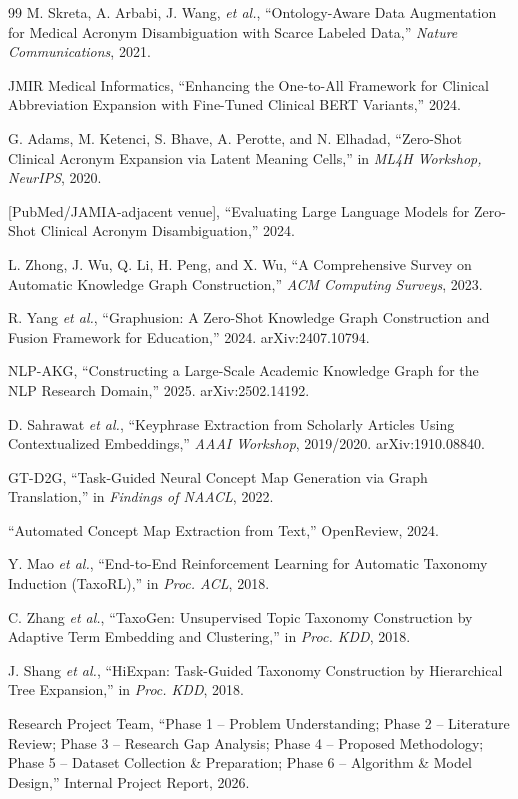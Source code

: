 \documentclass[10pt,conference]{IEEEtran}
\begin{document}
\begin{thebibliography}{99}
 M. Skreta, A. Arbabi, J. Wang, \emph{et al.}, ``Ontology-Aware Data Augmentation for Medical Acronym Disambiguation with Scarce Labeled Data,'' \emph{Nature Communications}, 2021.

 JMIR Medical Informatics, ``Enhancing the One-to-All Framework for Clinical Abbreviation Expansion with Fine-Tuned Clinical BERT Variants,'' 2024.

 G. Adams, M. Ketenci, S. Bhave, A. Perotte, and N. Elhadad, ``Zero-Shot Clinical Acronym Expansion via Latent Meaning Cells,'' in \emph{ML4H Workshop, NeurIPS}, 2020.

 [PubMed/JAMIA-adjacent venue], ``Evaluating Large Language Models for Zero-Shot Clinical Acronym Disambiguation,'' 2024.

 L. Zhong, J. Wu, Q. Li, H. Peng, and X. Wu, ``A Comprehensive Survey on Automatic Knowledge Graph Construction,'' \emph{ACM Computing Surveys}, 2023.

 R. Yang \emph{et al.}, ``Graphusion: A Zero-Shot Knowledge Graph Construction and Fusion Framework for Education,'' 2024. arXiv:2407.10794.

 NLP-AKG, ``Constructing a Large-Scale Academic Knowledge Graph for the NLP Research Domain,'' 2025. arXiv:2502.14192.

 D. Sahrawat \emph{et al.}, ``Keyphrase Extraction from Scholarly Articles Using Contextualized Embeddings,'' \emph{AAAI Workshop}, 2019/2020. arXiv:1910.08840.

 GT-D2G, ``Task-Guided Neural Concept Map Generation via Graph Translation,'' in \emph{Findings of NAACL}, 2022.

 ``Automated Concept Map Extraction from Text,'' OpenReview, 2024.

 Y. Mao \emph{et al.}, ``End-to-End Reinforcement Learning for Automatic Taxonomy Induction (TaxoRL),'' in \emph{Proc. ACL}, 2018.

 C. Zhang \emph{et al.}, ``TaxoGen: Unsupervised Topic Taxonomy Construction by Adaptive Term Embedding and Clustering,'' in \emph{Proc. KDD}, 2018.

 J. Shang \emph{et al.}, ``HiExpan: Task-Guided Taxonomy Construction by Hierarchical Tree Expansion,'' in \emph{Proc. KDD}, 2018.

 Research Project Team, ``Phase 1 -- Problem Understanding; Phase 2 -- Literature Review; Phase 3 -- Research Gap Analysis; Phase 4 -- Proposed Methodology; Phase 5 -- Dataset Collection \& Preparation; Phase 6 -- Algorithm \& Model Design,'' Internal Project Report, 2026.


\end{thebibliography}
\end{document}
